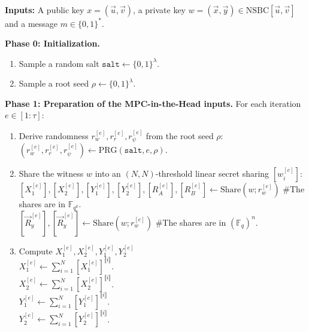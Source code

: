 \documentclass[english]{article}
\newcommand{\lir}{\llbracket i \rrbracket}
\begin{document}
		\begin{tcolorbox}[title=Protocol 15: Signing Algorithm, breakable, enhanced, colback=white, colframe=black]\label{Protocol_sig}
			\textbf{Inputs:} A public key $x = (\vec{u}, \vec{v})$, a private key $w = (\vec{x}, \vec{y}) \in \text{NSBC}[\vec{u}, \vec{v}]$ and a message $m \in \{0,1\}^*$.
			
			\vspace{0.5em}
			\textbf{Phase 0: Initialization.}
			\begin{enumerate}[label=\arabic*.]
				\item Sample a random salt $\texttt{salt} \leftarrow \{0,1\}^{\lambda}$.
				\item Sample a root seed $\rho \leftarrow \{0,1\}^{\lambda}$.
			\end{enumerate}
			
			\vspace{0.5em}
			\textbf{Phase 1: Preparation of the MPC-in-the-Head inputs.} For each iteration $e \in [1:\tau]$:
			\begin{enumerate}[label=\arabic*.]
				\item Derive randomness $r^{[e]}_{w}, r^{[e]}_r, r^{[e]}_{\psi}$ from the root seed $\rho$: \\
				\quad $(r^{[e]}_w, r^{[e]}_r, r^{[e]}_{\psi}) \leftarrow \text{PRG}(\texttt{salt}, e, \rho)$.
				
				\item Share the witness $w$ into an $(N, N)$-threshold linear secret sharing $[w^{[e]}_i]$: \\
				\quad $[X_1^{[e]}], [X_2^{[e]}], [Y_1^{[e]}], [Y_2^{[e]}], [R_A^{[e]}], [R_B^{[e]}] \leftarrow \text{Share}(w; r^{[e]}_w)$ \#The shares are in $\mathbb{F}_{q^k}$. \\
				\quad $[\vec{R}_y^{[e]}], [\vec{R}_y^{[e]}] \leftarrow \text{Share}(w; r^{[e]}_w)$ \#The shares are in $(\mathbb{F}_{q})^n$.
				
				\item Compute $X_1^{[e]}, X_2^{[e]}, Y_1^{[e]}, Y_2^{[e]}$ \\
				\quad $X_1^{[e]} \leftarrow \sum_{i=1}^{N} [X_1^{[e]}]^{\lir}$. \\
				\quad $X_2^{[e]} \leftarrow \sum_{i=1}^{N} [X_2^{[e]}]^{\lir}$. \\
				\quad $Y_1^{[e]} \leftarrow \sum_{i=1}^{N} [Y_1^{[e]}]^{\lir}$. \\
				\quad $Y_2^{[e]} \leftarrow \sum_{i=1}^{N} [Y_2^{[e]}]^{\lir}$.
				

\end{enumerate}
\end{tcolorbox}
\end{document}
